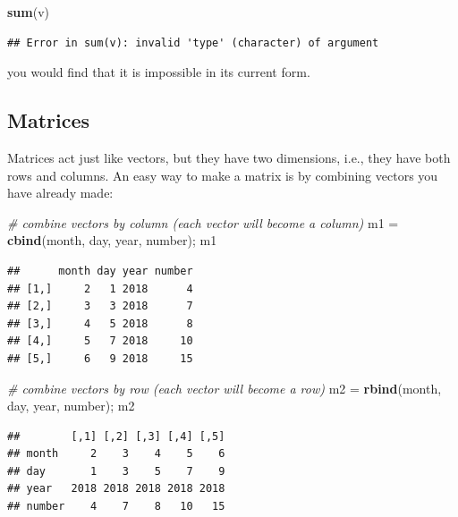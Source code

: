 \documentclass[]{book}
\newenvironment{Shaded}{\begin{snugshade}}{\end{snugshade}}
\newcommand{\KeywordTok}[1]{\textcolor[rgb]{0.13,0.29,0.53}{\textbf{#1}}}
\newcommand{\StringTok}[1]{\textcolor[rgb]{0.31,0.60,0.02}{#1}}
\newcommand{\CommentTok}[1]{\textcolor[rgb]{0.56,0.35,0.01}{\textit{#1}}}
\newcommand{\NormalTok}[1]{#1}
\theoremstyle{definition}
\theoremstyle{definition}
\theoremstyle{definition}
\theoremstyle{remark}
\begin{document}
\begin{Shaded}
\begin{Highlighting}[]
\KeywordTok{sum}\NormalTok{(v)}
\end{Highlighting}
\end{Shaded}

\begin{verbatim}
## Error in sum(v): invalid 'type' (character) of argument
\end{verbatim}

you would find that it is impossible in its current form.

\subsection{Matrices}\label{matrices}

Matrices act just like vectors, but they have two dimensions, i.e., they
have both rows and columns. An easy way to make a matrix is by combining
vectors you have already made:

\begin{Shaded}
\begin{Highlighting}[]
\CommentTok{# combine vectors by column (each vector will become a column)}
\NormalTok{m1 =}\StringTok{ }\KeywordTok{cbind}\NormalTok{(month, day, year, number); m1}
\end{Highlighting}
\end{Shaded}

\begin{verbatim}
##      month day year number
## [1,]     2   1 2018      4
## [2,]     3   3 2018      7
## [3,]     4   5 2018      8
## [4,]     5   7 2018     10
## [5,]     6   9 2018     15
\end{verbatim}

\begin{Shaded}
\begin{Highlighting}[]
\CommentTok{# combine vectors by row (each vector will become a row)}
\NormalTok{m2 =}\StringTok{ }\KeywordTok{rbind}\NormalTok{(month, day, year, number); m2}
\end{Highlighting}
\end{Shaded}

\begin{verbatim}
##        [,1] [,2] [,3] [,4] [,5]
## month     2    3    4    5    6
## day       1    3    5    7    9
## year   2018 2018 2018 2018 2018
## number    4    7    8   10   15
\end{verbatim}
\end{document}
